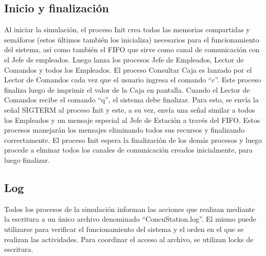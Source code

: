 \documentclass{article}
\begin{document}
\subsection{Inicio y finalización}
Al iniciar la simulación, el proceso Init crea todas las memorias compartidas y semáforos (estos últimos también los inicializa) necesarios para el funcionamiento del sistema, así como también el FIFO que sirve como canal de comunicación con el Jefe de empleados. Luego lanza los procesos Jefe de Empleados, Lector de Comandos y todos los Empleados. El proceso Consultar Caja es lanzado por el Lector de Comandos cada vez que el usuario ingresa el comando ``c''. Este proceso finaliza luego de imprimir el valor de la Caja en pantalla.
Cuando el Lector de Comandos recibe el comando ``q'', el sistema debe finalizar. Para esto, se envía la señal SIGTERM al proceso Init y este, a su vez, envía una señal similar a todos los Empleados y un mensaje especial al Jefe de Estación a través del FIFO. Estos procesos manejarán los mensajes eliminando todos sus recursos y finalizando correctamente. El proceso Init espera la finalización de los demás procesos y luego procede a elminar todos los canales de comunicación creados inicialmente, para luego finalizar.
\subsection{Log}
Todos los procesos de la simulación informan las acciones que realizan mediante la escritura a un único archivo denominado ``ConcuStation.log''. El mismo puede utilizarse para verificar el funcionamiento del sistema y el orden en el que se realizan las actividades. Para coordinar el acceso al archivo, se utilizan locks de escritura.
\end{document}
